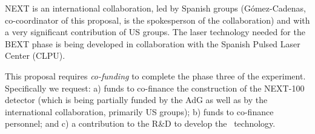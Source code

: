 NEXT is an international collaboration, led by Spanish groups (G\'omez-Cadenas, co-coordinator of this proposal, is the spokesperson of the collaboration) and with a very significant contribution of US groups. The laser technology needed for the BEXT phase is being developed in collaboration with the Spanish Pulsed Laser Center (CLPU). 

This proposal requires {\em co-funding} to complete the phase three of the experiment. Specifically we request: a) funds to co-finance the construction of the NEXT-100 detector (which is being partially funded by the AdG as well as by the international collaboration, primarily US groups); b) funds to co-finance personnel; and c) a  contribution to the R\&D to develop the \BATA\ technology.   


